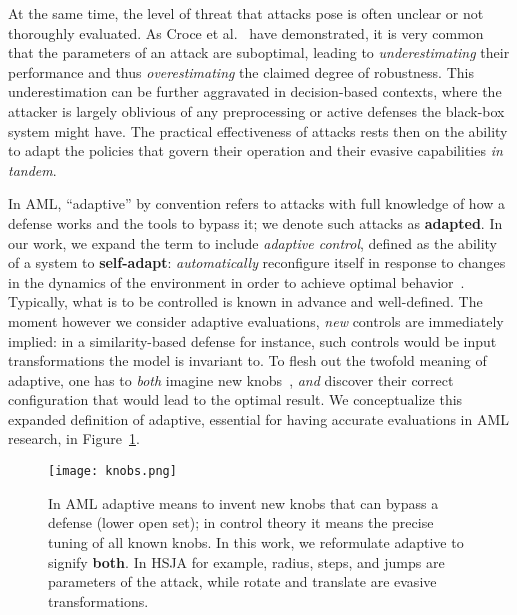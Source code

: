 At the same time, the level of threat that attacks pose is often unclear or not thoroughly evaluated.
As Croce et al.~\cite{croce2020reliable} have demonstrated, it is very common that the parameters of an attack are suboptimal, leading to \textit{underestimating} their performance and thus \textit{overestimating} the claimed degree of robustness.
This underestimation can be further aggravated in decision-based contexts, where the attacker is largely oblivious of any preprocessing or active defenses the black-box system might have.
The practical effectiveness of attacks rests then on the ability to adapt the policies that govern their operation and their evasive capabilities \textit{in tandem}.

In \gls{AML}, ``adaptive'' by convention refers to attacks with full knowledge of how a defense works and the tools to bypass it; we denote such attacks as \textbf{adapted}.
In our work, we expand the term to include \textit{adaptive control}, defined as the ability of a system to \textbf{self-adapt}: \emph{automatically} reconfigure itself in response to changes in the dynamics of the environment in order to achieve optimal behavior~\cite{aastrom2013adaptive}.
Typically, what is to be controlled is known in advance and well-defined.
The moment however we consider adaptive evaluations, \textit{new} controls are immediately implied: in a similarity-based defense for instance, such controls would be input transformations the model is invariant to.
To flesh out the twofold meaning of adaptive, one has to \textit{both} imagine new knobs~\cite{hofstadter2008metamagical}, \textit{and} discover their correct configuration that would lead to the optimal result.
We conceptualize this expanded definition of adaptive, essential for having accurate evaluations in \gls{AML} research, in Figure~\ref{fig:adaptivity}.

\begin{figure}
    \centering
    \texttt{[image: knobs.png]}
    \caption{In \gls{AML} adaptive means to invent new knobs that can bypass a defense (lower open set); in control theory it means the precise tuning of all known knobs. In this work, we reformulate adaptive to signify \textbf{both}. In HSJA for example, radius, steps, and jumps are parameters of the attack, while rotate and translate are evasive transformations.}
    \label{fig:adaptivity}
\end{figure}

